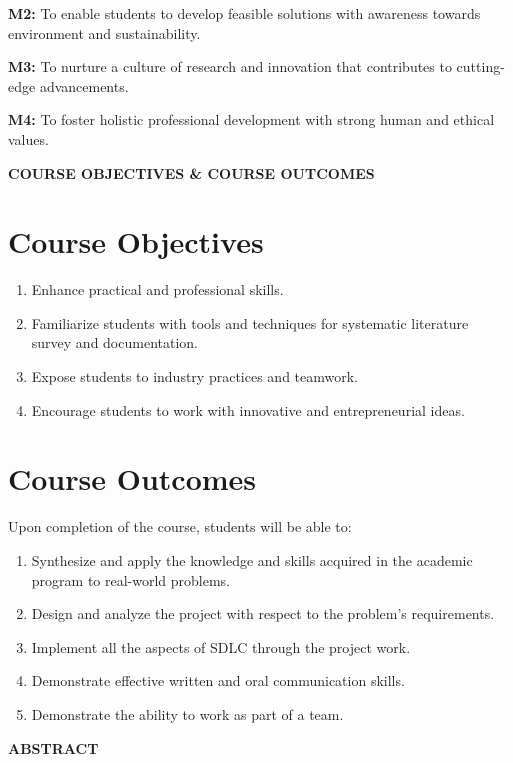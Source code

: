 \documentclass[12pt,a4paper,oneside]{report}
\numberwithin{equation}{chapter}
\newcommand{\FrontHeading}[1]{\begin{center}\fontsize{14}{18}\selectfont\bfseries #1\end{center}\vspace{0.6cm}}
\begin{document}
\noindent\textbf{M2:} To enable students to develop feasible solutions with awareness towards environment and sustainability.

\noindent\textbf{M3:} To nurture a culture of research and innovation that contributes to cutting-edge advancements.

\noindent\textbf{M4:} To foster holistic professional development with strong human and ethical values.

\FrontHeading{COURSE OBJECTIVES \& COURSE OUTCOMES}
\section*{Course Objectives}
\begin{enumerate}[leftmargin=*]
\item Enhance practical and professional skills.
\item Familiarize students with tools and techniques for systematic literature survey and documentation.
\item Expose students to industry practices and teamwork.
\item Encourage students to work with innovative and entrepreneurial ideas.
\end{enumerate}
\section*{Course Outcomes}
Upon completion of the course, students will be able to:
\begin{enumerate}[leftmargin=*]
\item Synthesize and apply the knowledge and skills acquired in the academic program to real-world problems.
\item Design and analyze the project with respect to the problem's requirements.
\item Implement all the aspects of SDLC through the project work.
\item Demonstrate effective written and oral communication skills.
\item Demonstrate the ability to work as part of a team.
\end{enumerate}

\FrontHeading{ABSTRACT}
\end{document}
